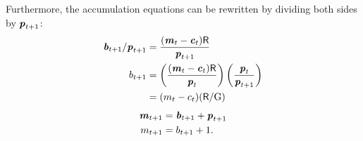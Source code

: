 \documentclass{scrartcl}
\begin{document}
Furthermore, the accumulation equations can be rewritten by dividing
both sides by $\boldsymbol{\mathit{p}}_{t+1}$:
\begin{equation}\begin{gathered}\begin{aligned}
        \boldsymbol{\mathit{b}}_{t+1}/\boldsymbol{\mathit{p}}_{t+1} & =  \frac{(\boldsymbol{\mathit{m}}_{t}-\boldsymbol{\mathit{c}}_{t})\mathsf{R}}{\boldsymbol{\mathit{p}}_{t+1}}  \\
        b_{t+1} & =   \left(\frac{(\boldsymbol{\mathit{m}}_{t}-\boldsymbol{\mathit{c}}_{t})\mathsf{R}}{\boldsymbol{\mathit{p}}_{t}}\right)\left(\frac{\boldsymbol{\mathit{p}}_{t}}{\boldsymbol{\mathit{p}}_{t+1}}\right) \\
         & =  (m_{t}-c_{t})(\mathsf{R}/{\mathrm{G}})
\end{aligned}\end{gathered}\end{equation}
\begin{equation}\begin{gathered}\begin{aligned}
        \boldsymbol{\mathit{m}}_{t+1} & =  \boldsymbol{\mathit{b}}_{t+1}+\boldsymbol{\mathit{p}}_{t+1}
\\      m_{t+1} & =  b_{t+1}+1.
\end{aligned}\end{gathered}\end{equation}
\end{document}
